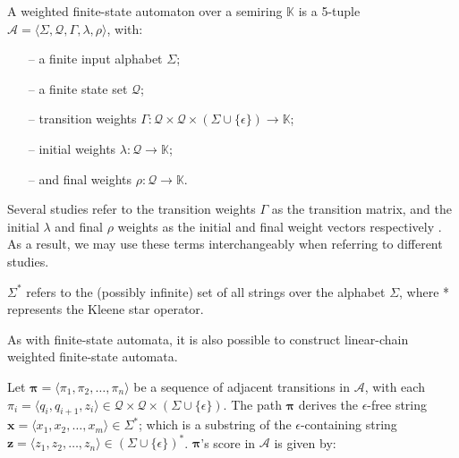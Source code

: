 \begin{definition}
  \label{def:wfa}
  A weighted finite-state automaton over a semiring $\mathbb{K}$ is a 5-tuple
  $\mathcal{A} = \langle \Sigma, \mathcal{Q}, \Gamma, \lambda, \rho \rangle$,
  with:

  \begin{itemize}
    \itemsep0em
    \item[--] a finite input alphabet $\Sigma$;
    \item[--] a finite state set $\mathcal{Q}$;
    \item[--] transition weights $\Gamma: \mathcal{Q} \times \mathcal{Q} \times
    (\Sigma \cup \{\epsilon\}) \rightarrow \mathbb{K}$;
    \item[--] initial weights $\lambda: \mathcal{Q} \rightarrow \mathbb{K}$;
    \item[--] and final weights $\rho: \mathcal{Q} \rightarrow \mathbb{K}$.
  \end{itemize}

  \begin{remark}
    Several studies refer to the transition weights $\Gamma$ as the transition
    matrix, and the initial $\lambda$ and final $\rho$ weights as the initial
    and final weight vectors respectively
    \citep{schwartz2018sopa,jiang2020cold}. As a result, we may use these terms
    interchangeably when referring to different studies.
  \end{remark}
    
  \begin{remark}
    $\Sigma^{*}$ refers to the (possibly infinite) set of all strings over the
    alphabet $\Sigma$, where * represents the Kleene star operator.
  \end{remark}

  \begin{remark}
    As with finite-state automata, it is also possible to construct linear-chain
    weighted finite-state automata.
  \end{remark}
  
\end{definition}

\begin{definition}

  Let $\pmb{\pi} = \langle \pi_1, \pi_2, \dots, \pi_n \rangle$ be a sequence of
  adjacent transitions in $\mathcal{A}$, with each $\pi_i = \langle q_i,
  q_{i+1}, z_i \rangle \in \mathcal{Q} \times \mathcal{Q} \times (\Sigma \cup
  \{\epsilon\})$. The path $\pmb{\pi}$ derives the $\epsilon$-free string
  $\pmb{x} = \langle x_1, x_2, \dots, x_m \rangle \in \Sigma^{*}$; which is a
  substring of the $\epsilon$-containing string $\pmb{z} = \langle z_1, z_2,
  \dots, z_n \rangle \in (\Sigma \cup \{\epsilon\})^{*}$. $\pmb{\pi}$'s score in
  $\mathcal{A}$ is given by:
  
\end{definition}

